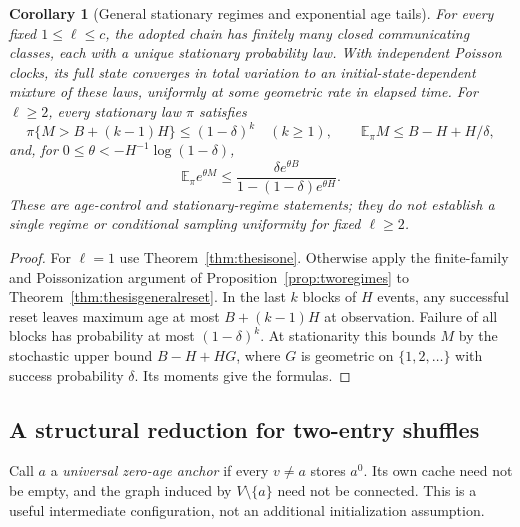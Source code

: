 \documentclass[11pt]{article}
\newtheorem{corollary}[theorem]{Corollary}
\begin{document}
\begin{corollary}[General stationary regimes and exponential age tails]
\label{cor:thesisgeneralregimes}
For every fixed $1\le\ell\le c$, the adopted chain has
finitely many closed communicating classes, each with a
unique stationary probability law. With independent Poisson
clocks, its full state converges in total variation to an
initial-state-dependent mixture of these laws, uniformly
at some geometric rate in elapsed time.
For $\ell\ge2$, every stationary law $\pi$ satisfies
\[
 \pi\{M>B+(k-1)H\}\le(1-\delta)^k\quad(k\ge1),
 \qquad
 \mathbb E_\pi M\le B-H+H/\delta,
\]
and, for $0\le\theta<-H^{-1}\log(1-\delta)$,
\[
 \mathbb E_\pi e^{\theta M}
 \le\frac{\delta e^{\theta B}}
 {1-(1-\delta)e^{\theta H}}.
\]
These are age-control and stationary-regime statements;
they do not establish a single regime or conditional sampling
uniformity for fixed $\ell\ge2$.
\end{corollary}
\begin{proof}
For $\ell=1$ use Theorem~\ref{thm:thesisone}.
Otherwise apply the finite-family and Poissonization argument
of Proposition~\ref{prop:tworegimes} to
Theorem~\ref{thm:thesisgeneralreset}.
In the last $k$ blocks of $H$ events, any successful reset
leaves maximum age at most $B+(k-1)H$ at observation.
Failure of all blocks has probability at most $(1-\delta)^k$.
At stationarity this bounds $M$ by the stochastic upper bound
$B-H+HG$, where $G$ is geometric on $\{1,2,\ldots\}$ with
success probability $\delta$. Its moments give the formulas.
\end{proof}

\subsection{A structural reduction for two-entry shuffles}

Call $a$ a \emph{universal zero-age anchor} if every
$v\ne a$ stores $a^0$. Its own cache need not be empty,
and the graph induced by $V\setminus\{a\}$ need not be
connected. This is a useful intermediate configuration,
not an additional initialization assumption.
\end{document}
